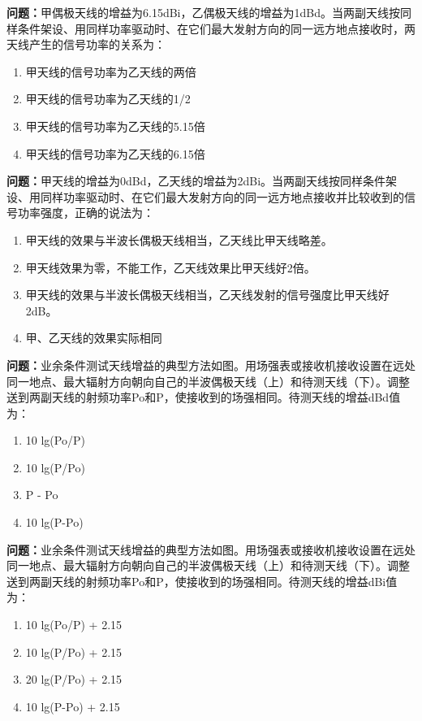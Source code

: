 \bigskip


\noindent\textbf{问题：}甲偶极天线的增益为6.15dBi，乙偶极天线的增益为1dBd。当两副天线按同样条件架设、用同样功率驱动时、在它们最大发射方向的同一远方地点接收时，两天线产生的信号功率的关系为：
\begin{enumerate}[label=\Alph*), leftmargin=3em]
\item 甲天线的信号功率为乙天线的两倍
\item 甲天线的信号功率为乙天线的1/2
\item 甲天线的信号功率为乙天线的5.15倍
\item 甲天线的信号功率为乙天线的6.15倍
\end{enumerate}

\bigskip


\noindent\textbf{问题：}甲天线的增益为0dBd，乙天线的增益为2dBi。当两副天线按同样条件架设、用同样功率驱动时、在它们最大发射方向的同一远方地点接收并比较收到的信号功率强度，正确的说法为：
\begin{enumerate}[label=\Alph*), leftmargin=3em]
\item 甲天线的效果与半波长偶极天线相当，乙天线比甲天线略差。
\item 甲天线效果为零，不能工作，乙天线效果比甲天线好2倍。
\item 甲天线的效果与半波长偶极天线相当，乙天线发射的信号强度比甲天线好2dB。
\item 甲、乙天线的效果实际相同
\end{enumerate}

\bigskip


\noindent\textbf{问题：}业余条件测试天线增益的典型方法如图。用场强表或接收机接收设置在远处同一地点、最大辐射方向朝向自己的半波偶极天线（上）和待测天线（下）。调整送到两副天线的射频功率Po和P，使接收到的场强相同。待测天线的增益dBd值为：
\begin{enumerate}[label=\Alph*), leftmargin=3em]
\item 10 lg(Po/P)
\item 10 lg(P/Po)
\item P - Po
\item 10 lg(P-Po)
\end{enumerate}

\bigskip


\noindent\textbf{问题：}业余条件测试天线增益的典型方法如图。用场强表或接收机接收设置在远处同一地点、最大辐射方向朝向自己的半波偶极天线（上）和待测天线（下）。调整送到两副天线的射频功率Po和P，使接收到的场强相同。待测天线的增益dBi值为：
\begin{enumerate}[label=\Alph*), leftmargin=3em]
\item 10 lg(Po/P) + 2.15
\item 10 lg(P/Po) + 2.15
\item 20 lg(P/Po) + 2.15
\item 10 lg(P-Po) + 2.15
\end{enumerate}

